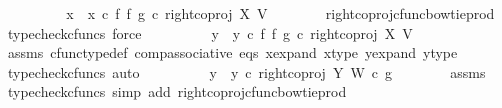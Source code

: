 \begin{isabellebody}
\ \ \ \ \isamarkupfalse%
\ \isamarkupfalse%
\ {\isachardoublequoteopen}{\isachardot}{\kern0pt}{\isachardot}{\kern0pt}{\isachardot}{\kern0pt}\ {\isacharequal}{\kern0pt}\ {\isacharparenleft}{\kern0pt}x{}\ {\isasymamalg}\ x{}{\isacharparenright}{\kern0pt}\ {\isasymcirc}\isactrlsub c\ {\isacharparenleft}{\kern0pt}f\ {\isasymbowtie}\isactrlsub f\ g{\isacharparenright}{\kern0pt}\ {\isasymcirc}\isactrlsub c\ right{\isacharunderscore}{\kern0pt}coproj\ X\ V{\isachardoublequoteclose}\isanewline
\ \ \ \ \ \ \isamarkupfalse%
\ right{\isacharunderscore}{\kern0pt}coproj{\isacharunderscore}{\kern0pt}cfunc{\isacharunderscore}{\kern0pt}bowtie{\isacharunderscore}{\kern0pt}prod\ \isamarkupfalse%
\ {\isacharparenleft}{\kern0pt}typecheck{\isacharunderscore}{\kern0pt}cfuncs{\isacharcomma}{\kern0pt}\ force{\isacharparenright}{\kern0pt}\isanewline
\ \ \ \ \isamarkupfalse%
\ \isamarkupfalse%
\ {\isachardoublequoteopen}{\isachardot}{\kern0pt}{\isachardot}{\kern0pt}{\isachardot}{\kern0pt}\ {\isacharequal}{\kern0pt}\ {\isacharparenleft}{\kern0pt}y{}\ {\isasymamalg}\ y{}{\isacharparenright}{\kern0pt}\ {\isasymcirc}\isactrlsub c\ {\isacharparenleft}{\kern0pt}f\ {\isasymbowtie}\isactrlsub f\ g{\isacharparenright}{\kern0pt}\ {\isasymcirc}\isactrlsub c\ right{\isacharunderscore}{\kern0pt}coproj\ X\ V{\isachardoublequoteclose}\isanewline
\ \ \ \ \ \ \isamarkupfalse%
\ assms\ cfunc{\isacharunderscore}{\kern0pt}type{\isacharunderscore}{\kern0pt}def\ comp{\isacharunderscore}{\kern0pt}associative\ eqs\ x{\isacharunderscore}{\kern0pt}expand\ x{\isacharunderscore}{\kern0pt}type\ y{\isacharunderscore}{\kern0pt}expand\ y{\isacharunderscore}{\kern0pt}type\ \isamarkupfalse%
\ {\isacharparenleft}{\kern0pt}typecheck{\isacharunderscore}{\kern0pt}cfuncs{\isacharcomma}{\kern0pt}\ auto{\isacharparenright}{\kern0pt}\isanewline
\ \ \ \ \isamarkupfalse%
\ \isamarkupfalse%
\ {\isachardoublequoteopen}{\isachardot}{\kern0pt}{\isachardot}{\kern0pt}{\isachardot}{\kern0pt}\ {\isacharequal}{\kern0pt}\ {\isacharparenleft}{\kern0pt}y{}\ {\isasymamalg}\ y{}{\isacharparenright}{\kern0pt}\ {\isasymcirc}\isactrlsub c\ right{\isacharunderscore}{\kern0pt}coproj\ Y\ W\ {\isasymcirc}\isactrlsub c\ g{\isachardoublequoteclose}\isanewline
\ \ \ \ \ \ \isamarkupfalse%
\ assms\ \isamarkupfalse%
\ {\isacharparenleft}{\kern0pt}typecheck{\isacharunderscore}{\kern0pt}cfuncs{\isacharcomma}{\kern0pt}\ simp\ add{\isacharcolon}{\kern0pt}\ right{\isacharunderscore}{\kern0pt}coproj{\isacharunderscore}{\kern0pt}cfunc{\isacharunderscore}{\kern0pt}bowtie{\isacharunderscore}{\kern0pt}prod{\isacharparenright}{\kern0pt}\isanewline

\end{isabellebody}
